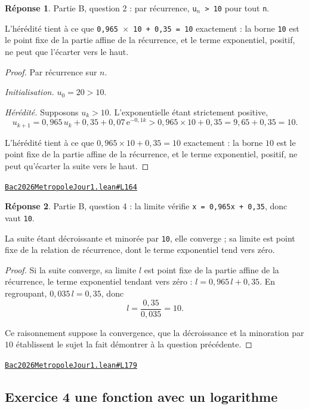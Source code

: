 \documentclass[11pt,a4paper]{article}
\theoremstyle{definition}
\theoremstyle{plain}
\theoremstyle{definition}
\newtheorem*{reponse}{Réponse}
\newcommand{\source}[2]{\par\smallskip\noindent\hfill{\footnotesize\href{#1}{\texttt{#2}}}\par\smallskip}
\begin{document}
\begin{reponse}
Partie B, question 2 : par récurrence, \texttt{u\(_{n}\) > 10} pour tout \texttt{n}.

L'hérédité tient à ce que \texttt{0,965 \(\times\) 10 + 0,35 = 10} exactement : la borne \texttt{10} est le
point fixe de la partie affine de la récurrence, et le terme exponentiel, positif, ne
peut que l'écarter vers le haut.
\end{reponse}
\begin{proof}
Par récurrence sur $n$.

\emph{Initialisation.} $u_0 = 20 > 10$.

\emph{Hérédité.} Supposons $u_k > 10$. L'exponentielle étant strictement positive,
\[ u_{k+1} = 0{,}965\,u_k + 0{,}35 + 0{,}07\,\mathrm{e}^{-0{,}1k}
   > 0{,}965 \times 10 + 0{,}35 = 9{,}65 + 0{,}35 = 10 . \]

L'hérédité tient à ce que $0{,}965 \times 10 + 0{,}35 = 10$ exactement : la borne $10$ est
le point fixe de la partie affine de la récurrence, et le terme exponentiel, positif, ne
peut qu'écarter la suite vers le haut.
\end{proof}
\source{https://github.com/Commutator-IO/learn-lean/blob/main/exams/2026/Bac2026MetropoleJour1.lean\#L164}{Bac2026MetropoleJour1.lean\#L164}

\begin{reponse}
Partie B, question 4 : la limite vérifie \texttt{x = 0,965x + 0,35}, donc vaut \texttt{10}.

La suite étant décroissante et minorée par \texttt{10}, elle converge ; sa limite est point
fixe de la relation de récurrence, dont le terme exponentiel tend vers zéro.
\end{reponse}
\begin{proof}
Si la suite converge, sa limite $l$ est point fixe de la partie affine de la récurrence,
le terme exponentiel tendant vers zéro : $l = 0{,}965\,l + 0{,}35$. En regroupant,
$0{,}035\,l = 0{,}35$, donc
\[ l = \frac{0{,}35}{0{,}035} = 10 . \]

Ce raisonnement suppose la convergence, que la décroissance et la minoration par $10$
établissent \textemdash{} le sujet la fait démontrer à la question précédente.
\end{proof}
\source{https://github.com/Commutator-IO/learn-lean/blob/main/exams/2026/Bac2026MetropoleJour1.lean\#L179}{Bac2026MetropoleJour1.lean\#L179}

\subsection{Exercice 4 \textemdash{} une fonction avec un logarithme}
\end{document}
